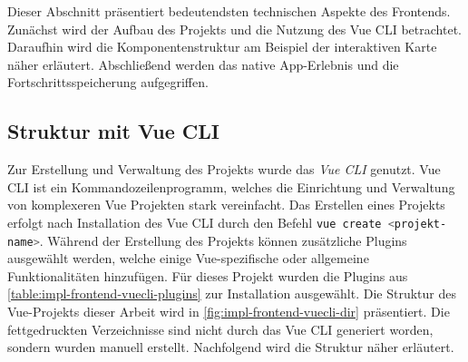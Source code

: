 Dieser Abschnitt präsentiert bedeutendsten technischen Aspekte des Frontends.
Zunächst wird der Aufbau des Projekts und die Nutzung des Vue CLI betrachtet.
Daraufhin wird die Komponentenstruktur am Beispiel der interaktiven Karte näher
erläutert. Abschließend werden das native App-Erlebnis und die
Fortschrittsspeicherung aufgegriffen.

\subsection{Struktur mit Vue CLI} \label{ssec:impl-frontend-structure}

Zur Erstellung und Verwaltung des Projekts wurde das \textit{Vue CLI} genutzt.
Vue CLI ist ein Kommandozeilenprogramm, welches die Einrichtung und Verwaltung
von komplexeren Vue Projekten stark vereinfacht. Das Erstellen eines Projekts
erfolgt nach Installation des Vue CLI durch den Befehl \lstinline[style=code,
    language=bash, style=inline]{vue create <projekt-name>}. Während der Erstellung
des Projekts können zusätzliche Plugins ausgewählt werden, welche einige
Vue-spezifische oder allgemeine Funktionalitäten hinzufügen. Für dieses Projekt
wurden die Plugins aus \autoref{table:impl-frontend-vuecli-plugins} zur
Installation ausgewählt. Die Struktur des Vue-Projekts dieser Arbeit wird in
\autoref{fig:impl-frontend-vuecli-dir} präsentiert. Die fettgedruckten
Verzeichnisse sind nicht durch das Vue CLI generiert worden, sondern wurden
manuell erstellt. Nachfolgend wird die Struktur näher erläutert.

